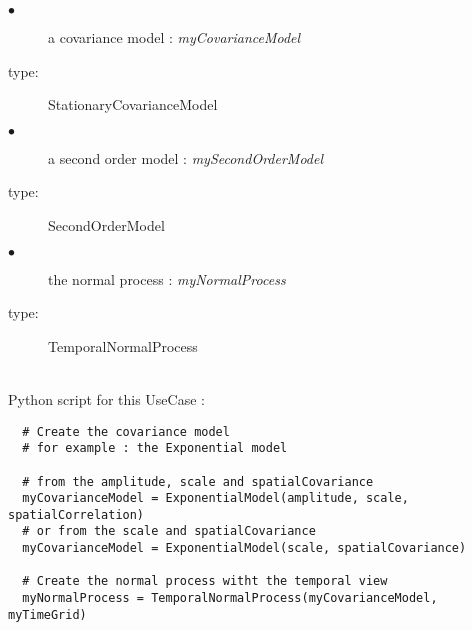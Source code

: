 {
  \begin{description}
  \item[$\bullet$] a covariance model : {\itshape myCovarianceModel }
  \item[type:] StationaryCovarianceModel
  \end{description}

  \begin{description}
  \item[$\bullet$] a second order model : {\itshape mySecondOrderModel }
  \item[type:] SecondOrderModel
  \end{description}

  \begin{description}
  \item[$\bullet$] the normal process : {\itshape myNormalProcess}
  \item[type:]  TemporalNormalProcess 
  \end{description}


}

\textspace\\
Python script for this UseCase :

\begin{lstlisting}
  # Create the covariance model
  # for example : the Exponential model

  # from the amplitude, scale and spatialCovariance
  myCovarianceModel = ExponentialModel(amplitude, scale, spatialCorrelation)
  # or from the scale and spatialCovariance
  myCovarianceModel = ExponentialModel(scale, spatialCovariance)

  # Create the normal process witht the temporal view
  myNormalProcess = TemporalNormalProcess(myCovarianceModel, myTimeGrid)
\end{lstlisting}



